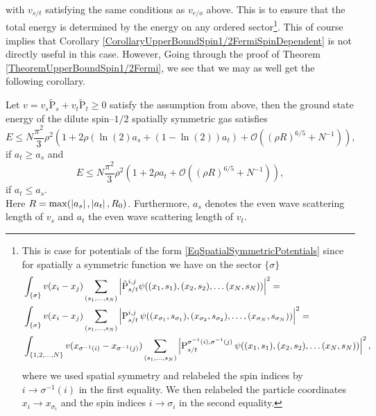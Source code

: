 with $v_{s/t}$ satisfying the same conditions as $v_{e/o}$ above. This is to ensure that the total energy is determined by the energy on any ordered sector\footnote{This is case for potentials of the form \eqref{EqSpatialSymmetricPotentials} since for spatially a symmetric function we have on the sector $ \{\sigma\} $ \begin{equation*}
		\begin{aligned}
		&\int_{\{\sigma\}}v(x_i-x_j)\sum_{(s_1,\ldots,s_N)}\left\lvert \tilde{\operatorname{P}}_{s/t}^{i,j}\psi((x_1,s_1),(x_2,s_2),\ldots(x_N,s_N)) \right\rvert^2=\\
		&\int_{\{\sigma\}}v(x_i-x_j)\sum_{(s_1,\ldots,s_N)}\left\lvert \operatorname{P}_{s/t}^{i,j}\psi((x_{\sigma_1},s_{\sigma_1}),(x_{\sigma_2},s_{\sigma_2}),\ldots,(x_{\sigma_N},s_{\sigma_N})) \right\rvert^2=\\
		&\int_{\{1,2,\ldots,N\}}v(x_{\sigma^{-1}(i)}-x_{\sigma^{-1}(j)})\sum_{(s_1,\ldots,s_N)}\left\lvert \operatorname{P}_{s/t}^{\sigma^{-1}(i),\sigma^{-1}(j)}\psi((x_1,s_1),(x_2,s_2),\ldots(x_N,s_N)) \right\rvert^2,
		\end{aligned}
\end{equation*}
where we used spatial symmetry and relabeled the spin indices by $i\to \sigma^{-1}(i)$ in the first equality. We then relabeled the particle coordinates $x_i\to x_{\sigma_i}$ and the spin indices $i\to\sigma_i$ in the second equality.}. This of course implies that Corollary \ref{CorollaryUpperBoundSpin1/2FermiSpinDependent} is not directly useful in this case. However, Going through the proof of Theorem \ref{TheoremUpperBoundSpin1/2Fermi}, we see that we may as well get the following corollary.
\begin{corollary}\label{CorollaryUpperBoundSpin1/2SymmetricSpinDependent}
	Let $ v=v_s\operatorname{\tilde{P}}_s+v_t\operatorname{\tilde{P}}_t\geq0 $ satisfy the assumption from above, then the ground state energy of the dilute spin--$ 1/2 $ spatially symmetric gas satisfies\begin{equation}
	E\leq N\frac{\pi^2}{3}\rho^2\left(1+2\rho \left(\ln(2) a_s+(1-\ln(2))a_t\right)+\mathcal{O}\left((\rho R)^{6/5}+N^{-1}\right)\right),
	\end{equation}
	if $ a_t\geq a_s $ and 
	\begin{equation}
	E\leq N\frac{\pi^2}{3}\rho^2\left(1+2\rho a_t+\mathcal{O}\left((\rho R)^{6/5}+N^{-1}\right)\right),
	\end{equation}
	if $ a_t \leq a_s $.\\
	Here $ R=\max(\left\lvert a_s \right\rvert, \left\lvert a_t \right\rvert, R_0) $. Furthermore, $ a_s $ denotes the even wave scattering length of $ v_s $ and $ a_t $ the even wave scattering length of $ v_t $.
\end{corollary}
